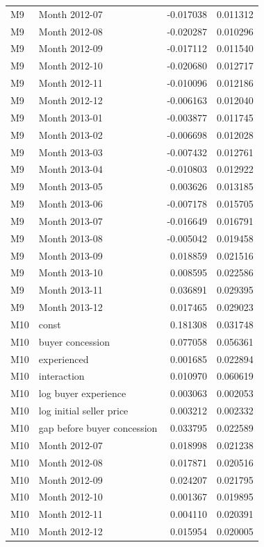 \documentclass[11pt,a4paper]{article}
\begin{document}
\begin{longtable}{lp{8.4cm}rr}
M9 & Month 2012-07 & -0.017038 & 0.011312 \\
M9 & Month 2012-08 & -0.020287 & 0.010296 \\
M9 & Month 2012-09 & -0.017112 & 0.011540 \\
M9 & Month 2012-10 & -0.020680 & 0.012717 \\
M9 & Month 2012-11 & -0.010096 & 0.012186 \\
M9 & Month 2012-12 & -0.006163 & 0.012040 \\
M9 & Month 2013-01 & -0.003877 & 0.011745 \\
M9 & Month 2013-02 & -0.006698 & 0.012028 \\
M9 & Month 2013-03 & -0.007432 & 0.012761 \\
M9 & Month 2013-04 & -0.010803 & 0.012922 \\
M9 & Month 2013-05 & 0.003626 & 0.013185 \\
M9 & Month 2013-06 & -0.007178 & 0.015705 \\
M9 & Month 2013-07 & -0.016649 & 0.016791 \\
M9 & Month 2013-08 & -0.005042 & 0.019458 \\
M9 & Month 2013-09 & 0.018859 & 0.021516 \\
M9 & Month 2013-10 & 0.008595 & 0.022586 \\
M9 & Month 2013-11 & 0.036891 & 0.029395 \\
M9 & Month 2013-12 & 0.017465 & 0.029023 \\
M10 & const & 0.181308 & 0.031748 \\
M10 & buyer concession & 0.077058 & 0.056361 \\
M10 & experienced & 0.001685 & 0.022894 \\
M10 & interaction & 0.010970 & 0.060619 \\
M10 & log buyer experience & 0.003063 & 0.002053 \\
M10 & log initial seller price & 0.003212 & 0.002332 \\
M10 & gap before buyer concession & 0.033795 & 0.022589 \\
M10 & Month 2012-07 & 0.018998 & 0.021238 \\
M10 & Month 2012-08 & 0.017871 & 0.020516 \\
M10 & Month 2012-09 & 0.024207 & 0.021795 \\
M10 & Month 2012-10 & 0.001367 & 0.019895 \\
M10 & Month 2012-11 & 0.004110 & 0.020391 \\
M10 & Month 2012-12 & 0.015954 & 0.020005 \\

\end{longtable}
\end{document}
